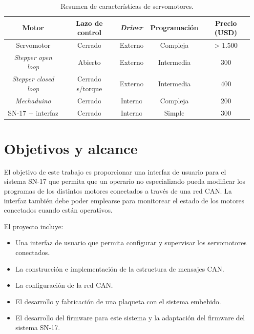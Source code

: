 \begin{table}[h!]
	\centering
	\caption[Estado del arte]{Resumen de características de servomotores.}
	\begin{tabular}{c c c c c}    
		\toprule
		\textbf{Motor} 	 & \textbf{Lazo de control}  & \textbf{\textit{Driver}} & \textbf{Programación} & \textbf{Precio (USD)} \\
		\midrule
		Servomotor & Cerrado & Externo & Compleja 	& >  1.500 \\		
		\textit{Stepper open loop} & Abierto & Externo & Intermedia 	&  300\\
		\textit{Stepper closed loop} & Cerrado s/torque	& Externo & Intermedia 	&  400\\
		\textit{Mechaduino} & Cerrado	& Interno & Compleja 	&  200 \\
		SN-17 + interfaz	& Cerrado	& Interno & Simple 		&  300 \\
		\bottomrule
		\hline
	\end{tabular}
	\label{tab:servos}
\end{table}

\section{Objetivos y alcance}

El objetivo de este trabajo es proporcionar una interfaz de usuario para el sistema SN-17 que permita que un operario no especializado pueda modificar los programas de los distintos motores conectados a través de una red CAN. La interfaz también debe poder emplearse para monitorear el estado de los motores conectados cuando están operativos. 

El proyecto incluye:

\begin{itemize}
	\item Una interfaz de usuario que permita configurar y supervisar los servomotores conectados.
	\item La construcción e implementación de la estructura de mensajes CAN.
	\item La configuración de la red CAN.
	\item El desarrollo y fabricación de una plaqueta con el sistema embebido.
	\item El desarrollo del firmware para este sistema y la adaptación del firmware del sistema SN-17.
\end{itemize}


